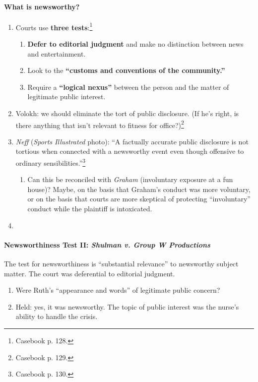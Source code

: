 \paragraph{What is newsworthy?}

\begin{enumerate}
    \item Courts use \textbf{three tests}:\footnote{Casebook p. 128.}
    \begin{enumerate}
        \item \textbf{Defer to editorial judgment} and make no distinction 
        between news and entertainment.
        \item Look to the \textbf{``customs and conventions of the community.''}
        \item Require a \textbf{``logical nexus''} between the person and the 
        matter of legitimate public interest.
    \end{enumerate}
    \item Volokh: we should eliminate the tort of public disclosure. (If he's 
    right, is there anything that isn't relevant to fitness for 
    office?)\footnote{Casebook p. 129.}
    \item \emph{Neff} (\emph{Sports Illustrated} photo): ``A factually accurate 
    public disclosure is not tortious when connected with a newsworthy event 
    even though offensive to ordinary sensibilities.''\footnote{Casebook p.  
    130.}
    \begin{enumerate}
        \item Can this be reconciled with \emph{Graham} (involuntary exposure at 
        a fun house)? Maybe, on the basis that Graham's conduct was more 
        voluntary, or on the basis that courts are more skeptical of protecting
        ``involuntary'' conduct while the plaintiff is intoxicated.
    \end{enumerate}
    \item
\end{enumerate}

\paragraph{Newsworthiness Test II: \emph{Shulman v. Group W Productions}}

The test for newsworthiness is ``substantial relevance'' to newsworthy subject 
matter. The court was deferential to editorial judgment.

\begin{enumerate}
    \item Were Ruth's ``appearance and words'' of legitimate public concern?
    \item Held: yes, it was newsworthy. The topic of public interest was the 
    nurse's ability to handle the crisis.
\end{enumerate}


